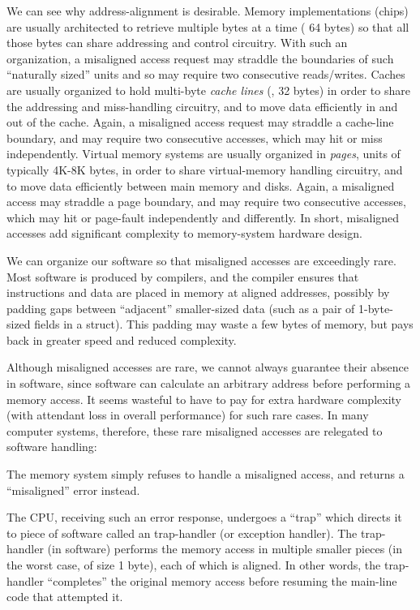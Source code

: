 We can see why address-alignment is desirable.  Memory implementations
(chips) are usually architected to retrieve multiple bytes at a time
({\eg} 64 bytes) so that all those bytes can share addressing and
control circuitry.  With such an organization, a misaligned access
request may straddle the boundaries of such ``naturally sized'' units
and so may require two consecutive reads/writes.  Caches are usually
organized to hold multi-byte \emph{cache lines} ({\eg}, 32 bytes) in
order to share the addressing and miss-handling circuitry, and to move
data efficiently in and out of the cache.  Again, a misaligned access
request may straddle a cache-line boundary, and may require two
consecutive accesses, which may hit or miss independently.  Virtual
memory systems are usually organized in \emph{pages}, units of
typically 4K-8K bytes, in order to share virtual-memory handling
circuitry, and to move data efficiently between main memory and disks.
Again, a misaligned access may straddle a page boundary, and may
require two consecutive accesses, which may hit or page-fault
independently and differently.  In short, misaligned accesses add
significant complexity to memory-system hardware design.

We can organize our software so that misaligned accesses are
exceedingly rare.  Most software is produced by compilers, and the
compiler ensures that instructions and data are placed in memory at
aligned addresses, possibly by padding gaps between ``adjacent''
smaller-sized data (such as a pair of 1-byte-sized fields in a
struct).  This padding may waste a few bytes of memory, but pays back
in greater speed and reduced complexity.

Although misaligned accesses are rare, we cannot always guarantee
their absence in software, since software can calculate an arbitrary
address before performing a memory access.  It seems wasteful to have
to pay for extra hardware complexity (with attendant loss in overall
performance) for such rare cases.  In many computer systems,
therefore, these rare misaligned accesses are relegated to software
handling:

\begin{tightlist}

\item The memory system simply refuses to handle a misaligned access,
  and returns a ``misaligned'' error instead.

\item The CPU, receiving such an error response, undergoes a ``trap''
  which directs it to piece of software called an trap-handler (or
  exception handler).  The trap-handler (in software) performs the
  memory access in multiple smaller pieces (in the worst case, of size
  1 byte), each of which is aligned.  In other words, the trap-handler
  ``completes'' the original memory access before resuming the
  main-line code that attempted it.

\end{tightlist}

